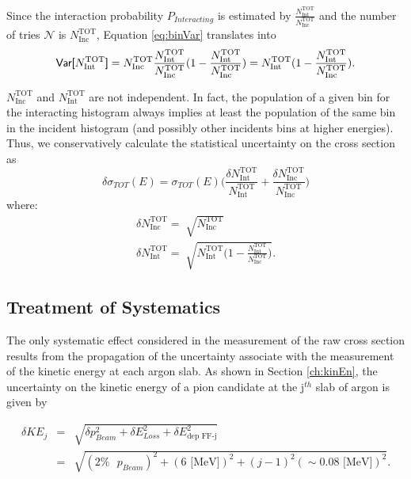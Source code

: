 Since the interaction probability $P_{Interacting}$ is estimated by $\frac{ N^{\text{TOT}}_{\text{Int}}}{N^{\text{TOT}}_{\text{Inc}}}$ and the number of tries $\mathcal{N}$ is $N^{\text{TOT}}_{\text{Inc}}$, Equation \ref{eq:binVar} translates into
\begin{equation}
\text{\textsf{Var[}} N^{\text{TOT}}_{\text{Int}} \text{\textsf{]}}
= N^{\text{TOT}}_{\text{Inc}}\frac{ N^{\text{TOT}}_{\text{Int}}}{N^{\text{TOT}}_{\text{Inc}}} (1-\frac{ N^{\text{TOT}}_{\text{Int}}}{N^{\text{TOT}}_{\text{Inc}}}) = N^{\text{TOT}}_{\text{Int}}(1-\frac{ N^{\text{TOT}}_{\text{Int}}}{N^{\text{TOT}}_{\text{Inc}}}). 
\end{equation}

$N^{\text{TOT}}_{\text{Inc}}$ and $N^{\text{TOT}}_{\text{Int}}$ are not independent. In fact, the population of a given bin for the interacting histogram always implies at least the population of the same bin in the incident histogram  (and possibly other incidents bins at higher energies). Thus, we conservatively calculate the statistical uncertainty on the cross section as 
\begin{equation}
\delta\sigma_{TOT}(E) = \sigma_{TOT}(E) \Big(\frac{\delta N^{\text{TOT}}_{\text{Int}}}{N^{\text{TOT}}_{\text{Int}}}+\frac{\delta N^{\text{TOT}}_{\text{Inc}}}{N^{\text{TOT}}_{\text{Inc}}}\Big) 
\end{equation}
where:
\begin{eqnarray}
\delta N^{\text{TOT}}_{\text{Inc}} = \sqrt[]{N^{\text{TOT}}_{\text{Inc}}} \\
\delta N^{\text{TOT}}_{\text{Int}} = \sqrt[]{N^{\text{TOT}}_{\text{Int}}\Big(1-\frac{ N^{\text{TOT}}_{\text{Int}}}{N^{\text{TOT}}_{\text{Inc}}}\Big)}.
\end{eqnarray}



\subsection{Treatment of Systematics} \label{ch:SysUncertaintyXSRaw}
The only systematic effect considered in the measurement of the raw cross section results from the propagation of the uncertainty associate with the measurement of the kinetic energy at each argon slab. As shown in Section \ref{ch:kinEn}, the uncertainty on the kinetic energy of a pion candidate at the j$^{th}$ slab of argon  is given by

\begin{eqnarray}
\delta KE_{j} &=& \sqrt{\delta p_{Beam}^2 + \delta E_{Loss}^2 +  \delta  E_{\text{dep FF-j}}^2}\\
&=& \sqrt{(2\% \text{ }p_{Beam})^2 +  ( 6 \text{ [MeV]})^2 +  (j-1)^2 (\sim0.08\text{ [MeV]})^2}.
\end{eqnarray}

